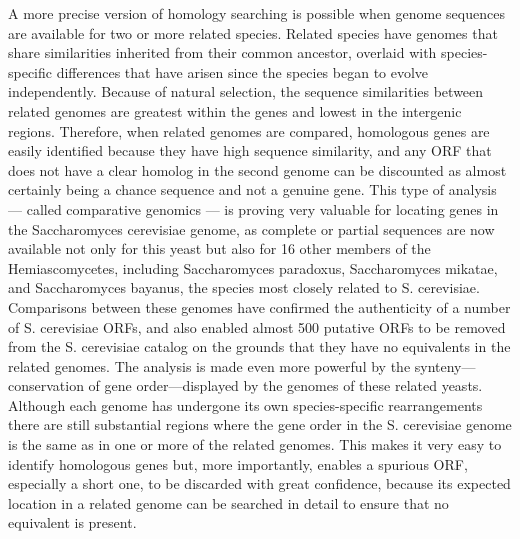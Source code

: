 A more precise version of homology searching is possible when genome sequences are available for two or more related species. Related species have
genomes that share similarities inherited from their common ancestor, overlaid with species-specific differences that have arisen since the species began
to evolve independently. Because of natural selection, the sequence similarities between related genomes are greatest within the genes and lowest in the 
intergenic regions. Therefore, when related genomes are compared, homologous genes are easily identified because they have high sequence similarity, 
and any ORF that does not have a clear homolog in the second genome can be discounted as almost certainly being a chance sequence and not a genuine gene. 
This type of analysis — called comparative genomics — is proving very valuable for locating genes in the Saccharomyces cerevisiae genome, as complete or partial
sequences are now available not only for this yeast but also for 16 other members of the Hemiascomycetes, including Saccharomyces paradoxus,
Saccharomyces mikatae, and Saccharomyces bayanus, the species most closely related to S. cerevisiae. Comparisons between these genomes have
confirmed the authenticity of a number of S. cerevisiae ORFs, and also enabled almost 500 putative ORFs to be removed from the S. cerevisiae catalog on the 
grounds that they have no equivalents in the related genomes. The analysis is made even more powerful by the synteny—conservation of gene
order—displayed by the genomes of these related yeasts. Although each genome has undergone its own species-specific rearrangements there are still
substantial regions where the gene order in the S. cerevisiae genome is the same as in one or more of the related genomes. This makes it very easy to
identify homologous genes but, more importantly, enables a spurious ORF, especially a short one, to be discarded with great confidence, because its
expected location in a related genome can be searched in detail to ensure that no equivalent is present.